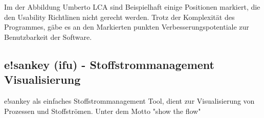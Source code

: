 \documentclass[a4paper, 12pt, twoside, BCOR=20mm, DIV=calc, abstracton, parskip=half*, toc=bibliography, toc=listof, headsepline, footsepline, headings=small, numbers=enddot]{scrreprt}
\begin{document}
	Im der Abbildung Umberto LCA sind Beispielhaft einige Positionen markiert, die den Usability Richtlinen nicht gerecht werden. 
	Trotz der Komplexität des Programmes, gäbe es an den Markierten punkten Verbesserungspotentiale zur Benutzbarkeit der Software. 
	
	
	\subsection{e!sankey (ifu) - Stoffstrommanagement Visualisierung}
	e!sankey als einfaches Stoffstrommanagement Tool, dient zur Visualisierung von Prozessen und Stoffströmen. Unter dem Motto "show the flow" 
	
\end{document}
